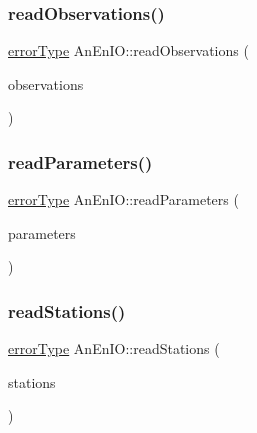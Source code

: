 \subsubsection{\texorpdfstring{read\+Observations()}{readObservations()}}
{\footnotesize\ttfamily \mbox{\hyperlink{class_an_en_i_o_aa56bc1ec6610b86db4349bce20f9ead0}{error\+Type}} An\+En\+I\+O\+::read\+Observations (\begin{DoxyParamCaption}\item[{\mbox{\hyperlink{class_observations}{Observations}} \&}]{observations }\end{DoxyParamCaption})}

\mbox{\label{class_an_en_i_o_a2b21ff04fcc0464017a5a717a6b19065}} 
\subsubsection{\texorpdfstring{read\+Parameters()}{readParameters()}}
{\footnotesize\ttfamily \mbox{\hyperlink{class_an_en_i_o_aa56bc1ec6610b86db4349bce20f9ead0}{error\+Type}} An\+En\+I\+O\+::read\+Parameters (\begin{DoxyParamCaption}\item[{\mbox{\hyperlink{classanen_par_1_1_parameters}{anen\+Par\+::\+Parameters}} \&}]{parameters }\end{DoxyParamCaption})}

\mbox{\label{class_an_en_i_o_aaec8b46a52f3d8ab904fd4229bd3b9e9}} 
\subsubsection{\texorpdfstring{read\+Stations()}{readStations()}}
{\footnotesize\ttfamily \mbox{\hyperlink{class_an_en_i_o_aa56bc1ec6610b86db4349bce20f9ead0}{error\+Type}} An\+En\+I\+O\+::read\+Stations (\begin{DoxyParamCaption}\item[{\mbox{\hyperlink{classanen_sta_1_1_stations}{anen\+Sta\+::\+Stations}} \&}]{stations }\end{DoxyParamCaption})}

\mbox{\label{class_an_en_i_o_a19b454b0a9ecb5ecbc2cc2a9c139770b}} 
